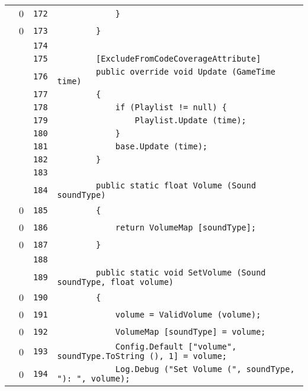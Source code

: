 \documentclass[a4paper,10pt]{article}
\begin{document}
\begin{longtable}[l]{lrrl}
\cellcolor{red} & 0 & \verb~172~ & \verb~            }~\\
\cellcolor{red} & 0 & \verb~173~ & \verb~        }~\\
\cellcolor{gray} &  & \verb~174~ & \verb~~\\
\cellcolor{gray} &  & \verb~175~ & \verb~        [ExcludeFromCodeCoverageAttribute]~\\
\cellcolor{gray} &  & \verb~176~ & \verb~        public override void Update (GameTime time)~\\
\cellcolor{gray} &  & \verb~177~ & \verb~        {~\\
\cellcolor{gray} &  & \verb~178~ & \verb~            if (Playlist != null) {~\\
\cellcolor{gray} &  & \verb~179~ & \verb~                Playlist.Update (time);~\\
\cellcolor{gray} &  & \verb~180~ & \verb~            }~\\
\cellcolor{gray} &  & \verb~181~ & \verb~            base.Update (time);~\\
\cellcolor{gray} &  & \verb~182~ & \verb~        }~\\
\cellcolor{gray} &  & \verb~183~ & \verb~~\\
\cellcolor{gray} &  & \verb~184~ & \verb~        public static float Volume (Sound soundType)~\\
\cellcolor{red} & 0 & \verb~185~ & \verb~        {~\\
\cellcolor{red} & 0 & \verb~186~ & \verb~            return VolumeMap [soundType];~\\
\cellcolor{red} & 0 & \verb~187~ & \verb~        }~\\
\cellcolor{gray} &  & \verb~188~ & \verb~~\\
\cellcolor{gray} &  & \verb~189~ & \verb~        public static void SetVolume (Sound soundType, float volume)~\\
\cellcolor{red} & 0 & \verb~190~ & \verb~        {~\\
\cellcolor{red} & 0 & \verb~191~ & \verb~            volume = ValidVolume (volume);~\\
\cellcolor{red} & 0 & \verb~192~ & \verb~            VolumeMap [soundType] = volume;~\\
\cellcolor{red} & 0 & \verb~193~ & \verb~            Config.Default ["volume", soundType.ToString (), 1] = volume;~\\
\cellcolor{red} & 0 & \verb~194~ & \verb~            Log.Debug ("Set Volume (", soundType, "): ", volume);~\\

\end{longtable}
\end{document}
